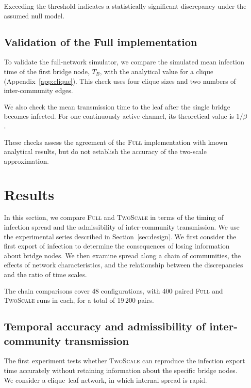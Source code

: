 \documentclass[a4paper,fleqn]{cas-sc}
\newcommand{\Full}{\textup{\textsc{Full}}}
\newcommand{\TS}{\textup{\textsc{TwoScale}}}
\begin{document}
Exceeding the threshold indicates a statistically significant discrepancy under the assumed null model.

\subsection{Validation of the Full implementation}

To validate the full-network simulator, we compare the simulated mean infection time of the first bridge node, $T_B$, with the analytical value for a clique (Appendix~\ref*{app:clique}). This check uses four clique sizes and two numbers of inter-community edges.

We also check the mean transmission time to the leaf after the single bridge becomes infected. For one continuously active channel, its theoretical value is $1/\beta$.

These checks assess the agreement of the \Full{} implementation with known analytical results, but do not establish the accuracy of the two-scale approximation.


\section{Results}
\label{sec:results}

In this section, we compare \Full{} and \TS{} in terms of the timing of infection spread and the admissibility of inter-community transmission. We use the experimental series described in Section~\ref{sec:design}. We first consider the first export of infection to determine the consequences of losing information about bridge nodes. We then examine spread along a chain of communities, the effects of network characteristics, and the relationship between the discrepancies and the ratio of time scales.

The chain comparisons cover 48 configurations, with 400 paired \Full{} and \TS{} runs in each, for a total of 19\,200 pairs.


\subsection{Temporal accuracy and admissibility of inter-community transmission}
\label{sec:res_clique}

The first experiment tests whether \TS{} can reproduce the infection export time accurately without retaining information about the specific bridge nodes. We consider a clique--leaf network, in which internal spread is rapid.
\end{document}
